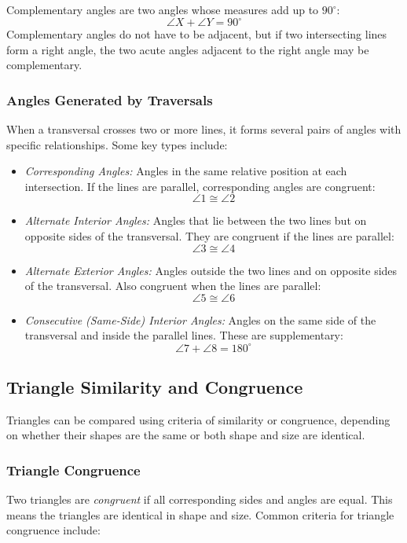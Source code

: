 Complementary angles are two angles whose measures add up to \(90^\circ\):
\[
\angle X + \angle Y = 90^\circ
\]
Complementary angles do not have to be adjacent, but if two intersecting lines form a right angle, the two acute angles adjacent to the right angle may be complementary.

\subsubsection*{Angles Generated by Traversals}

When a transversal crosses two or more lines, it forms several pairs of angles with specific relationships. Some key types include:

\begin{itemize}[label=\(-\)]
    \item \emph{Corresponding Angles:} Angles in the same relative position at each intersection. If the lines are parallel, corresponding angles are congruent:
    \[
    \angle 1 \cong \angle 2
    \]
    
    \item \emph{Alternate Interior Angles:} Angles that lie between the two lines but on opposite sides of the transversal. They are congruent if the lines are parallel:
    \[
    \angle 3 \cong \angle 4
    \]
    
    \item \emph{Alternate Exterior Angles:} Angles outside the two lines and on opposite sides of the transversal. Also congruent when the lines are parallel:
    \[
    \angle 5 \cong \angle 6
    \]
    
    \item \emph{Consecutive (Same-Side) Interior Angles:} Angles on the same side of the transversal and inside the parallel lines. These are supplementary:
    \[
    \angle 7 + \angle 8 = 180^\circ
    \]
\end{itemize}

\subsection{Triangle Similarity and Congruence}
Triangles can be compared using criteria of similarity or congruence, depending on whether their shapes are the same or both shape and size are identical.

\subsubsection{Triangle Congruence}
Two triangles are \emph{congruent} if all corresponding sides and angles are equal. This means the triangles are identical in shape and size. Common criteria for triangle congruence include:


